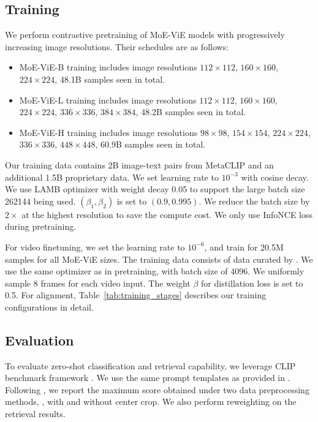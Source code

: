 \documentclass[runningheads]{llncs}
\begin{document}
\subsection{Training}
\label{appx_train_spec}

We perform contrastive pretraining of MoE-ViE models with progressively increasing image resolutions. Their schedules are as follows:
\begin{itemize}
\item MoE-ViE-B training includes image resolutions $112\times112$, $160\times160$, $224\times224$, 48.1B samples seen in total. 
\item MoE-ViE-L training includes image resolutions $112\times112$, $160\times160$, $224\times224$, $336\times336$, $384\times384$, 48.2B samples seen in total.
\item MoE-ViE-H training includes image resolutions $98\times98$,  $154\times154$, $224\times224$, $336\times336$, $448\times448$, 60.9B samples seen in total.
\end{itemize}
Our training data contains 2B image-text pairs from MetaCLIP \cite{metaclip} and an additional 1.5B proprietary data. We set learning rate to $10^{-3}$ with cosine decay. We use LAMB \cite{lamb} optimizer with weight decay 0.05 to support the large batch size 262144 being used. $(\beta_1,\beta_2)$ is set to $(0.9, 0.995)$. We reduce the batch size by $2\times$ at the highest resolution to save the compute cost. We only use InfoNCE loss \cite{infonce} during pretraining. 

For video finetuning, we set the learning rate to $10^{-6}$, and train for 20.5M samples for all MoE-ViE sizes. The training data consists of data curated by \cite{pe,merlot}. We use the same optimizer as in pretraining, with batch size of 4096. We uniformly sample 8 frames for each video input. The weight $\beta$ for distillation loss is set to 0.5. For alignment, Table~\ref{tab:training_stages} describes our training configurations in detail.

\subsection{Evaluation}
\label{appx_eval_spec}

To evaluate zero-shot classification and retrieval capability, we leverage CLIP benchmark framework \cite{clip_bench}. We use the same prompt templates as provided in \cite{pe}. Following \cite{eva-clip-18b}, we report the maximum score obtained under two data preprocessing methods, \ie, with and without center crop. We also perform reweighting \cite{internvl} on the retrieval results. 
\end{document}
